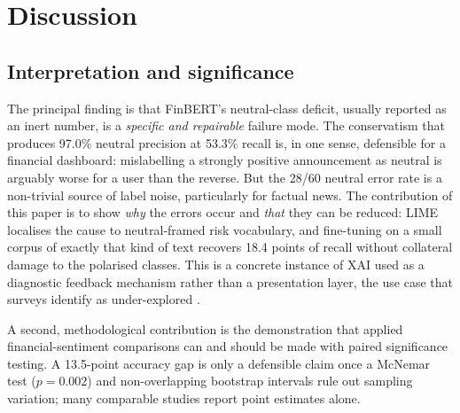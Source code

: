 \documentclass{aims}
\numberwithin{equation}{section}
\begin{document}
\section{Discussion}\label{sec:discussion}
\subsection{Interpretation and significance}
The principal finding is that FinBERT's neutral-class deficit, usually reported as
an inert number, is a \emph{specific and repairable} failure mode. The conservatism
that produces 97.0\% neutral precision at 53.3\% recall is, in one sense, defensible
for a financial dashboard: mislabelling a strongly positive announcement as neutral
is arguably worse for a user than the reverse. But the 28/60 neutral error rate is a
non-trivial source of label noise, particularly for factual news. The contribution
of this paper is to show \emph{why} the errors occur and \emph{that} they can be
reduced: LIME localises the cause to neutral-framed risk vocabulary, and fine-tuning
on a small corpus of exactly that kind of text recovers 18.4 points of recall without
collateral damage to the polarised classes. This is a concrete instance of XAI used
as a diagnostic feedback mechanism rather than a presentation layer, the use case
that surveys identify as under-explored \citep{yeo2025}.

A second, methodological contribution is the demonstration that applied
financial-sentiment comparisons can and should be made with paired significance
testing. A 13.5-point accuracy gap is only a defensible claim once a McNemar test
($p = 0.002$) and non-overlapping bootstrap intervals rule out sampling variation;
many comparable studies report point estimates alone.
\end{document}
